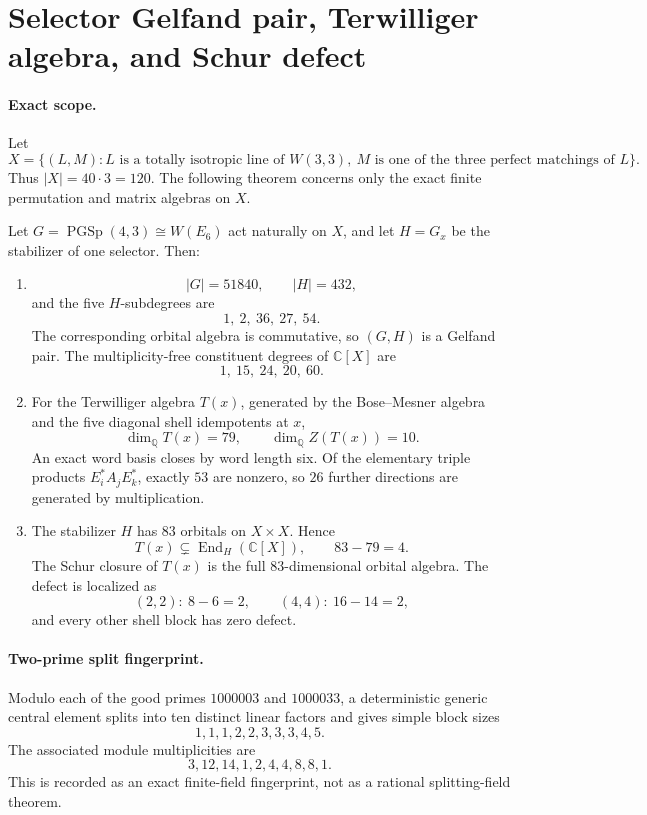 \section{Selector Gelfand pair, Terwilliger algebra, and Schur defect}
\label{sec:bt1360-bt1364-gelfand-terwilliger}

\paragraph{Exact scope.}
Let
\[
X=\{(L,M):L\text{ is a totally isotropic line of }W(3,3),
\ M\text{ is one of the three perfect matchings of }L\}.
\]
Thus \(|X|=40\cdot3=120\).  The following theorem concerns only the exact
finite permutation and matrix algebras on \(X\).

\begin{theorem}
Let \(G=\operatorname{PGSp}(4,3)\cong W(E_6)\) act naturally on \(X\), and
let \(H=G_x\) be the stabilizer of one selector.  Then:
\begin{enumerate}
\item
\[
|G|=51840,\qquad |H|=432,
\]
and the five \(H\)-subdegrees are
\[
1,\ 2,\ 36,\ 27,\ 54.
\]
The corresponding orbital algebra is commutative, so \((G,H)\) is a
Gelfand pair.  The multiplicity-free constituent degrees of
\(\mathbb C[X]\) are
\[
1,\ 15,\ 24,\ 20,\ 60.
\]

\item
For the Terwilliger algebra \(T(x)\), generated by the Bose--Mesner
algebra and the five diagonal shell idempotents at \(x\),
\[
\dim_{\mathbb Q}T(x)=79,
\qquad
\dim_{\mathbb Q}Z(T(x))=10.
\]
An exact word basis closes by word length six.  Of the elementary triple
products \(E_i^\ast A_jE_k^\ast\), exactly \(53\) are nonzero, so
\(26\) further directions are generated by multiplication.

\item
The stabilizer \(H\) has \(83\) orbitals on \(X\times X\).  Hence
\[
T(x)\subsetneq\operatorname{End}_{H}(\mathbb C[X]),
\qquad
83-79=4.
\]
The Schur closure of \(T(x)\) is the full \(83\)-dimensional orbital
algebra.  The defect is localized as
\[
(2,2):\ 8-6=2,
\qquad
(4,4):\ 16-14=2,
\]
and every other shell block has zero defect.
\end{enumerate}
\end{theorem}

\paragraph{Two-prime split fingerprint.}
Modulo each of the good primes \(1000003\) and \(1000033\), a
deterministic generic central element splits into ten distinct linear
factors and gives simple block sizes
\[
1,1,1,2,2,3,3,3,4,5.
\]
The associated module multiplicities are
\[
3,12,14,1,2,4,4,8,8,1.
\]
This is recorded as an exact finite-field fingerprint, not as a rational
splitting-field theorem.

